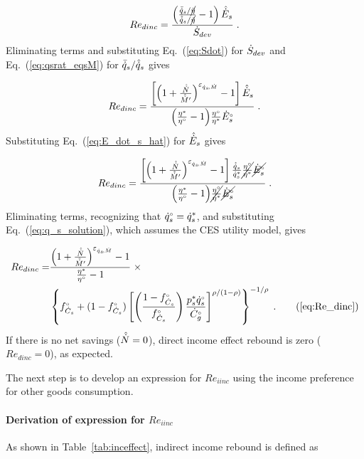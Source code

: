 \begin{equation}
  Re_{dinc} = \frac{\left( \frac{\bar{\dot{q}}_s / \cancel{\bar{\eta}}}{\hat{\dot{q}}_s / \cancel{\hat{\eta}}} - 1  \right) \hat{\dot{E}}_s}
              {\dot{S}_{dev}} \; .
\end{equation}
%
Eliminating terms and substituting Eq.~(\ref{eq:Sdot}) for $\dot{S}_{dev}$ and
Eq.~(\ref{eq:qsrat_eqsM}) for $\bar{\dot{q}}_s / \hat{\dot{q}}_s$ gives

\begin{equation}
  Re_{dinc} = \frac{\left[ \left( 1 + \frac{\hat{\dot{N}}}{\hat{\dot{M}}^\prime} \right) ^{\varepsilon_{\dot{q}_s\!,\dot{M}}} - 1  \right] \hat{\dot{E}}_s}
              {\left( \frac{{\eta}^*}{{}{\eta}^{\scriptscriptstyle \circ}} - 1 \right)\! \frac{{}{\eta}^{\scriptscriptstyle \circ}}{{\eta}^*} {}{\dot{E}}^{\scriptscriptstyle \circ}_s} \; .
\end{equation}
%
Substituting Eq.~(\ref{eq:E_dot_s_hat}) for $\hat{\dot{E}}_s$ gives

\begin{equation}
  Re_{dinc} = \frac{\left[ \left( 1 + \frac{\hat{\dot{N}}}{\hat{\dot{M}}^\prime} \right) ^{\varepsilon_{\dot{q}_s\!,\dot{M}}} - 1  \right]
                  \frac{\hat{\dot{q}}_s}{{\dot{q}}^*_s}
                \cancel{\frac{{}{\eta}^{\scriptscriptstyle \circ}}{{\eta}^*}}
                \cancel{{}{\dot{E}}^{\scriptscriptstyle \circ}_s}}
              {\left( \frac{{\eta}^*}{{}{\eta}^{\scriptscriptstyle \circ}} - 1 \right)\!
                  \cancel{\frac{{}{\eta}^{\scriptscriptstyle \circ}}{{\eta}^*}} \cancel{{}{\dot{E}}^{\scriptscriptstyle \circ}_s}} \; .
\end{equation}
%
Eliminating terms, recognizing that
${}{\dot{q}}^{\scriptscriptstyle \circ}_s = {\dot{q}}^*_s$, and substituting Eq.~(\ref{eq:q_s_solution}),
which assumes the CES utility model,
gives

\begin{align}
  Re_{dinc} = \Redinceqnexact{} \; . \tag{\ref{eq:Re_dinc}}
\end{align}
%
If there is no net savings ($\hat{\dot{N}} = 0$),
direct income effect rebound is zero ($Re_{dinc} = 0$), as expected.

The next step is to develop an expression for $Re_{iinc}$
using the income preference for other goods consumption.


\paragraph{Derivation of expression for $Re_{iinc}$}
\label{sec:Re_iinc}

As shown in Table~\ref{tab:inceffect}, indirect income rebound is defined as


